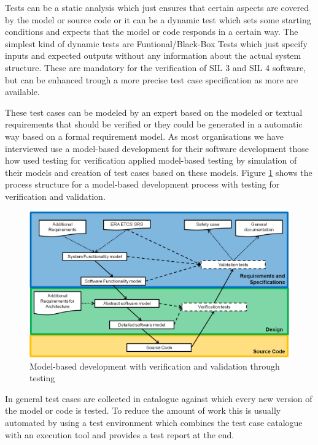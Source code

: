 \documentclass{./template/openetcs_report}
\begin{document}
Tests can be a static analysis which just ensures that certain aspects are covered by the model or source code or it can be a dynamic test which sets some starting conditions and expects that the model or code  responds in a certain way. The simplest kind of dynamic tests are Funtional/Black-Box Tests which just specify inputs and expected outputs without any information about the  actual system structure. These are mandatory for the verification of SIL 3 and SIL 4 software, but can be enhanced trough a more precise test case specification as more are available.

These test cases can be modeled by an expert based on the modeled or textual requirements that should be verified or they could be generated in a automatic way based on a formal requirement model. As most organisations we have interviewed use a model-based development for their software development those how used testing for verification applied model-based testing by simulation of their models and creation of test cases based on these models. Figure \ref{fig: MBD-Testing} shows the process structure for a model-based development process with testing for verification and validation.

\begin{figure}[h]
\centering
\includegraphics[scale=0.6]{Lifecycle-Model-based-Approach-Testing.png}
\caption{Model-based development with verification and validation through testing}
\label{fig: MBD-Testing}
\end{figure}

In general test cases are collected in catalogue against which every new version of the model or code is tested. To reduce the amount of work this is usually automated by using a test environment which combines the test case catalogue with an execution tool and provides a test report at the end.
\end{document}
